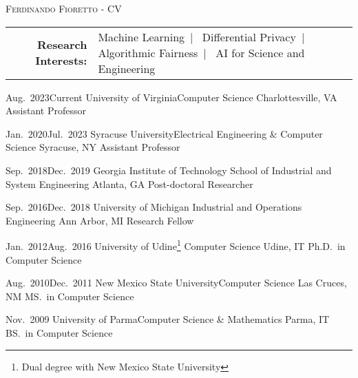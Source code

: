 \documentclass[localFont,alternative]{documentMETADATA}
\begin{document}
\makecvheader\sloppy\allowdisplaybreaks

	\makecvfooter
		{\textsc{}} %
		{\textsc{Ferdinando Fioretto - CV}}
		{\thepage}


\hspace{-12pt}	
	\begin{tabular}{r l} 
	{\bf Research Interests:} &
	{Machine Learning}~|~
	{Differential Privacy}~|~
	{Algorithmic Fairness}~|~
	{AI for Science and Engineering}
	\end{tabular}

\medskip

\begin{experiences}
  \job
    {Aug.~2023}{Current}
    {University of Virginia}{Computer Science}
    {Charlottesville, VA}
    {Assistant Professor}
    \emptySeparator

  \job
    {Jan.~2020}{Jul.~2023}
    {Syracuse University}{Electrical Engineering \& Computer Science}
    {Syracuse, NY}
    {Assistant Professor}
\end{experiences}



\begin{experiences}
    \job
    {Sep.~2018}{Dec.~2019}
    {Georgia Institute of Technology}
    {School of Industrial and System Engineering}
    {Atlanta, GA}
    {Post-doctoral Researcher}
    \emptySeparator

   \job
    {Sep.~2016}{Dec.~2018}
    {University of Michigan}
    {Industrial and Operations Engineering}
    {Ann Arbor, MI}
    {Research Fellow}    
	\emptySeparator

  \job
    {Jan.~2012}{Aug.~2016}
    {University of Udine\footnote{Dual degree with New Mexico State University}}
    {Computer Science}
    {Udine, IT}
    {Ph.D.~in Computer Science}
    \emptySeparator

  \job
    {Aug.~2010}{Dec.~2011}
    {New Mexico State University}{Computer Science}
    {Las Cruces, NM}
    {MS.~in Computer Science}
	\emptySeparator

  \job
    {}{Nov.~2009}
    {University of Parma}{Computer Science \& Mathematics}
    {Parma, IT}
    {BS.~in Computer Science}
\end{experiences}
\end{document}
